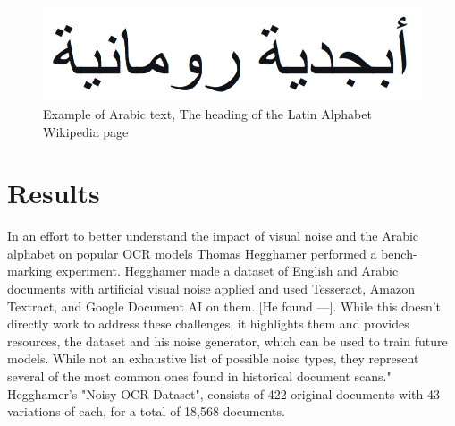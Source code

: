 \documentclass[sigplan,screen,nonacm]{acmart-tagged}
\begin{document}

\begin{figure}
  \includegraphics[width=\linewidth]{arabic.png}
  \caption{Example of Arabic text, The heading of the Latin Alphabet Wikipedia page}
  \label{arabic:alphabet}
\end{figure}

\section{Results}
\label{sec:Results}
In an effort to better understand the impact of visual noise and the Arabic alphabet on popular OCR models Thomas Hegghamer performed a bench-marking experiment. Hegghamer made a dataset of English and Arabic documents with artificial visual noise applied and used Tesseract, Amazon Textract, and Google Document AI on them. [He found ---]. While this doesn't directly work to address these challenges, it highlights them and provides resources, the dataset and his noise generator, which can be used to train future models. While not an exhaustive list of possible noise types, they represent several of the most common ones found in historical document scans."\citep{Hegghamer:2022} Hegghamer's "Noisy OCR Dataset", consists of 422 original documents with 43 variations of each, for a total of 18,568 documents.

\end{document}
